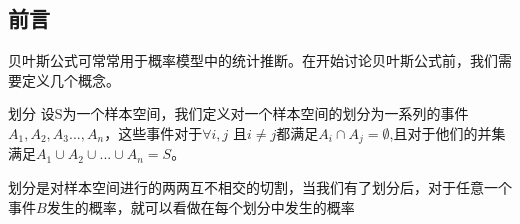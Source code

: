 
\subsection{前言}
贝叶斯公式可常常用于概率模型中的统计推断。在开始讨论贝叶斯公式前，我们需要定义几个概念。
\begin{definition}{划分}
设S为一个样本空间，我们定义对一个样本空间的划分为一系列的事件$A_1,A_2,A_3...,A_n$，这些事件对于$\forall i,j $ 且$i\neq j$都满足$A_i \cap A_j = \emptyset$,且对于他们的并集满足$A_1\cup A_2\cup ...\cup A_n = S$。
\end{definition}
划分是对样本空间进行的两两互不相交的切割，当我们有了划分后，对于任意一个事件$B$发生的概率，就可以看做在每个划分中发生的概率